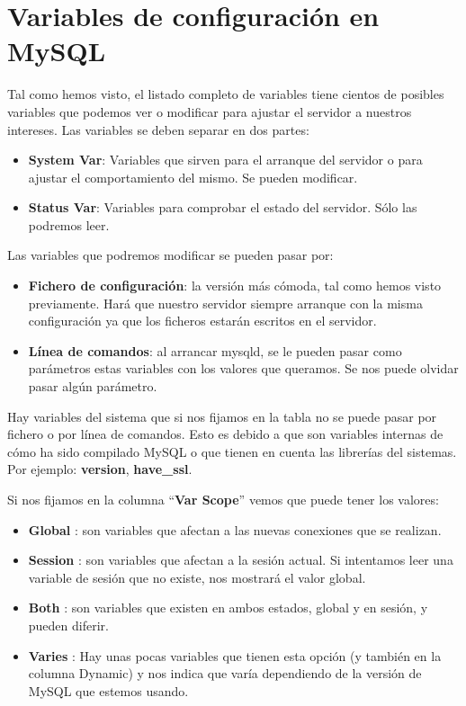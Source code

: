 \section{Variables de configuración en MySQL}
Tal como hemos visto, el listado completo de variables tiene cientos de posibles variables que podemos ver o modificar para ajustar el servidor a nuestros intereses. Las variables se deben separar en dos partes:

\begin{itemize}
    \item \textbf{System Var}: Variables que sirven para el arranque del servidor o para ajustar el comportamiento del mismo. Se pueden modificar.
    \item \textbf{Status Var}: Variables para comprobar el estado del servidor. Sólo las podremos leer.
\end{itemize}

Las variables que podremos modificar se pueden pasar por:

\begin{itemize}
    \item \textbf{Fichero de configuración}: la versión más cómoda, tal como hemos visto previamente. Hará que nuestro servidor siempre arranque con la misma configuración ya que los ficheros estarán escritos en el servidor.
    \item \textbf{Línea de comandos}: al arrancar mysqld, se le pueden pasar como parámetros estas variables con los valores que queramos. Se nos puede olvidar pasar algún parámetro.
\end{itemize}

Hay variables del sistema que si nos fijamos en la tabla no se puede pasar por fichero o por línea de comandos. Esto es debido a que son variables internas de cómo ha sido compilado MySQL o que tienen en cuenta las librerías del sistemas. Por ejemplo: \textbf{version}, \textbf{have\_ssl}.

Si nos fijamos en la columna “\textbf{Var Scope}” vemos que puede tener los valores:

\begin{itemize}
    \item \textbf{Global} : son variables que afectan a las nuevas conexiones que se realizan.
    \item \textbf{Session} : son variables que afectan a la sesión actual. Si intentamos leer una variable de sesión que no existe, nos mostrará el valor global.
    \item \textbf{Both} : son variables que existen en ambos estados, global y en sesión, y pueden diferir.
    \item \textbf{Varies} : Hay unas pocas variables que tienen esta opción (y también en la columna Dynamic) y nos indica que varía dependiendo de la versión de MySQL que estemos usando.
\end{itemize}

